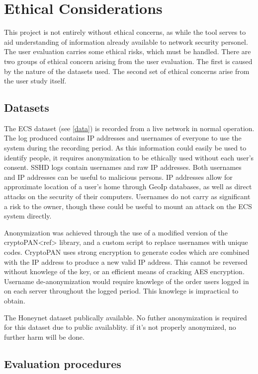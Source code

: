 \section{Ethical Considerations}

This project is not entirely without ethical concerns, as while the tool serves to aid understanding of information already available to network security personel. The user evaluation carries some ethical risks, which must be handled.
There are two groups of ethical concern arising from the user evaluation. The first is caused by the nature of the datasets used.  The second set of ethical concerns arise from the user study itself.

\subsection{Datasets}
The ECS dataset (see \ref{data}) is recorded from a live network in normal operation. The log produced contains IP addresses and usernames of everyone to use the system during the recording period. As this information could easily be used to identify people, it requires anonymization to be ethically used without each user's consent. SSHD logs contain usernames and raw IP addresses. Both usernames and IP addresses can be useful to malicious persons. IP addresses allow for approximate location of a user's home through GeoIp databases, as well as direct attacks on the security of their computers. Usernames do not carry as significant a risk to the owner, though these could be useful to mount an attack on the ECS system directly. 

Anonymization was achieved through the use of a modified version of the cryptoPAN<ref> library, and a custom script to replace usernames with unique codes. CryptoPAN uses strong encryption to generate codes which are combined with the IP address to produce a new valid IP address. This cannot be reversed without knowlege of the key, or an efficient means of cracking AES encryption. Username de-anonymization would require knowlege of the order users logged in on each server throughout the logged period. This knowlege is impractical to obtain. 

The Honeynet dataset publically available. No futher anonymization is required for this dataset due to public availablity. if it's not properly anonymized, no further harm will be done. 

\subsection{Evaluation procedures}

